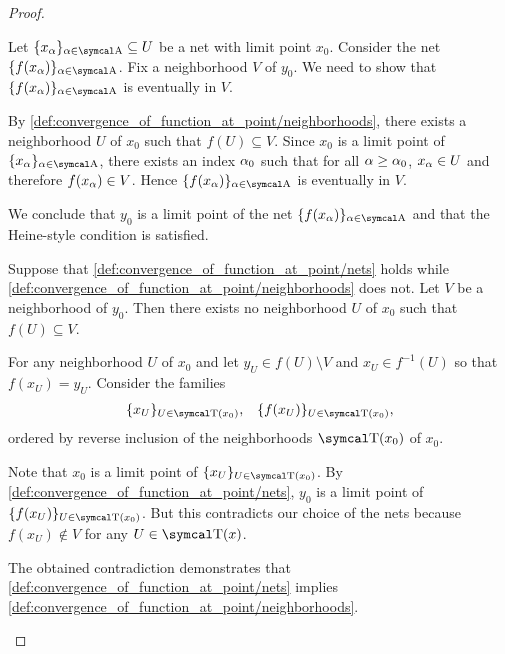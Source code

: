 \begin{proof}
  \begin{description}
     Let \( \{ x_\al \}_{\al \in \CA} \subseteq U \) be a net  with limit point \( x_0 \). Consider the net \( \{ f(x_\al) \}_{\al \in \CA} \). Fix a neighborhood \( V \) of \( y_0 \). We need to show that \( \{ f(x_\al) \}_{\al \in \CA} \) is eventually in \( V \).

    By \cref{def:convergence_of_function_at_point/neighborhoods}, there exists a neighborhood \( U \) of \( x_0 \) such that \( f(U) \subseteq V \). Since \( x_0 \) is a limit point of \( \{ x_\al \}_{\al \in \CA} \), there exists an index \( \alpha_0 \) such that for all \( \alpha \geq \alpha_0 \), \( x_\alpha \in U \) and therefore \( f(x_\alpha) \in V \). Hence \( \{ f(x_\al) \}_{\al \in \CA} \) is eventually in \( V \).

    We conclude that \( y_0 \) is a limit point of the net \( \{ f(x_\al) \}_{\al \in \CA} \) and that the Heine-style condition is satisfied.

     Suppose that \cref{def:convergence_of_function_at_point/nets} holds while \cref{def:convergence_of_function_at_point/neighborhoods} does not\LEM. Let \( V \) be a neighborhood of \( y_0 \). Then there exists no neighborhood \( U \) of \( x_0 \) such that \( f(U) \subseteq V \).

    For any neighborhood \( U \) of \( x_0 \) and let \( y_U \in f(U) \setminus V \) and \( x_U \in f^{-1} (U) \) so that \( f(x_U) = y_U \). Consider the families
    \begin{align*}
      \{ x_U \}_{U \in \CT(x_0)},
      &&
      \{ f(x_U) \}_{U \in \CT(x_0)},
    \end{align*}
    ordered by reverse inclusion  of the neighborhoods \( \CT(x_0) \) of \( x_0 \).

    Note that \( x_0 \) is a limit point of \( \{ x_U \}_{U \in \CT(x_0)} \). By \cref{def:convergence_of_function_at_point/nets}, \( y_0 \) is a limit point of \( \{ f(x_U) \}_{U \in \CT(x_0)} \). But this contradicts our choice of the nets because \( f(x_U) \not\in V \) for any \( U \in \CT(x) \).

    The obtained contradiction demonstrates that \cref{def:convergence_of_function_at_point/nets} implies \cref{def:convergence_of_function_at_point/neighborhoods}.
  \end{description}
\end{proof}

